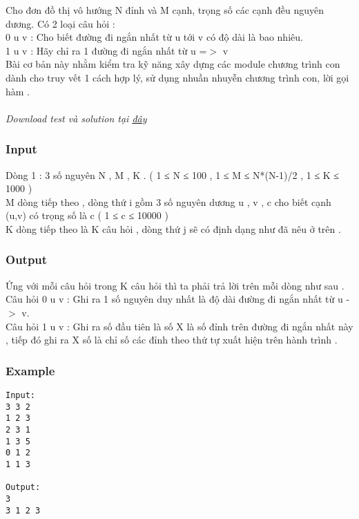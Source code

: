 



   Cho đơn đồ thị vô hướng N đỉnh và M cạnh, trọng số các cạnh đều nguyên dương. Có 2 loại câu hỏi :   
\\   0 u v : Cho biết đường đi ngắn nhất từ u tới v có độ dài là bao nhiêu.   
\\   1 u v : Hãy chỉ ra 1 đường đi ngắn nhất từ u =$>$ v   
\\   Bài cơ bản này nhằm kiểm tra kỹ năng xây dựng các module chương trình con dành cho truy vết 1 cách hợp lý, sử dụng nhuần nhuyễn chương trình con, lời gọi hàm .   
\\
\\\textit{    Download test và solution tại    \href{http://vn.spoj.pl/content/floyd.rar}{     đây    }}

\subsubsection{   Input  }

   Dòng 1 : 3 số nguyên N , M , K . ( 1 ≤ N ≤ 100 , 1 ≤ M ≤ N*(N-1)/2  , 1 ≤ K ≤ 1000 )   
\\   M dòng tiếp theo , dòng thứ i gồm 3 số nguyên dương u , v , c cho biết cạnh (u,v) có trọng số là c ( 1 ≤ c ≤ 10000 )   
\\   K dòng tiếp theo là K câu hỏi , dòng thứ j sẽ có định dạng như đã nêu ở trên .   
\\

\subsubsection{   Output  }

   Ứng với mỗi câu hỏi trong K câu hỏi thì ta phải trả lời trên mỗi dòng như sau .   
\\   Câu hỏi 0 u v : Ghi ra 1 số nguyên duy nhất là độ dài đường đi ngắn nhất từ u -$>$ v.   
\\   Câu hỏi 1 u v : Ghi ra số đầu tiên là số X là số đỉnh trên đường đi ngắn nhất này , tiếp đó ghi ra X số là chỉ số các đỉnh theo thứ tự xuất hiện trên hành trình .   
\\

\subsubsection{   Example  }
\begin{verbatim}
Input:
3 3 2
1 2 3
2 3 1
1 3 5
0 1 2
1 1 3

Output:
3
3 1 2 3
\end{verbatim}